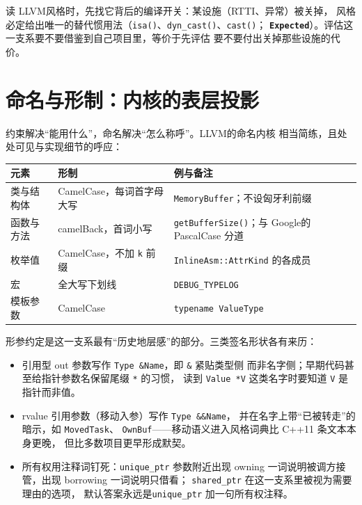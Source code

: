 \documentclass[12pt,a4paper,fontset=fandol]{ctexbook}
\newcommand{\cpp}[1]{C++#1}
\newcommand{\Fn}[1]{\texttt{#1()}}
\newcommand{\Tp}[1]{\texttt{#1}}
\newcommand{\Bk}{\discretionary{}{}{}}
\newcommand{\Lib}[1]{\textbf{\texttt{#1}}}
\newcommand{\Lang}[1]{\textsf{#1}}
\newcommand{\DomGo}{\Lang{Google}}
\newcommand{\DomLlvm}{\Lang{LLVM}}
\begin{document}
\begin{guideline}[title={约束先于条文}]
读 \DomLlvm 风格时，先找它背后的编译开关：某设施（RTTI、异常）被关掉，
风格必定给出唯一的替代惯用法（\Fn{isa}、\Fn{dyn\_{\Bk}cast}、\Fn{cast}；
\Lib{Expected}）。评估这一支系要不要借鉴到自己项目里，等价于先评估
要不要付出关掉那些设施的代价。
\end{guideline}

\section{命名与形制：内核的表层投影}
\label{sec:ch03-naming}

约束解决``能用什么''，命名解决``怎么称呼''。\DomLlvm 的命名内核
相当简练，且处处可见与实现细节的呼应：

{\small
\begin{longtable}{>{\raggedright\arraybackslash}p{} >{\raggedright\arraybackslash}p{} >{\raggedright\arraybackslash}p{}}
\toprule
元素 & 形制 & 例与备注 \\
\midrule
类与结构体 & CamelCase，每词首字母大写 & \Tp{Memory\allowbreak Buffer}；不设匈牙利前缀 \\
函数与方法 & camelBack，首词小写 & \Fn{get\allowbreak BufferSize}；与 \DomGo 的 PascalCase 分道 \\
枚举值 & CamelCase，不加 \Tp{k} 前缀 & \Tp{InlineAsm::\allowbreak AttrKind} 的各成员 \\
宏 & 全大写下划线 & \Tp{DEBUG\_TYPELOG} \\
模板参数 & CamelCase & \Tp{typename \allowbreak ValueType} \\
\bottomrule
\end{longtable}}

形参约定是这一支系最有``历史地层感''的部分。三类签名形状各有来历：

\begin{itemize}
  \item 引用型 out 参数写作 \Tp{Type \&Name}，即 \Tp{\&} 紧贴类型侧
        而非名字侧；早期代码甚至给指针参数名保留尾缀 \Tp{*} 的习惯，
        读到 \Tp{Value *V} 这类名字时要知道 \Tp{V} 是指针而非值。
  \item rvalue 引用参数（移动入参）写作 \Tp{Type \&\&Name}，
        并在名字上带``已被转走''的暗示，如 \Tp{MovedTask}、
        \Tp{OwnBuf}——移动语义进入风格词典比 \cpp{11} 条文本本身更晚，
        但比多数项目更早形成默契。
  \item 所有权用注释词钉死：\Tp{unique\_ptr} 参数附近出现
        owning 一词说明被调方接管，出现 borrowing 一词说明只借看；
        \Tp{shared\_ptr} 在这一支系里被视为需要理由的选项，
        默认答案永远是\Tp{unique\_ptr} 加一句所有权注释。
\end{itemize}
\end{document}
